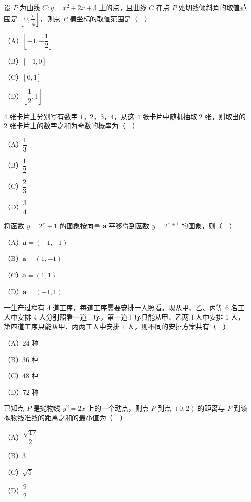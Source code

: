 \begin{question}
设 $P$ 为曲线 $C:y=x^2+2x+3$ 上的点，且曲线 $C$ 在点 $P$ 处切线倾斜角的取值范围是 $\left[0,\dfrac{\pi}{4}\right]$，则点 $P$ 横坐标的取值范围是（　）

（A）$\left[-1,-\dfrac12\right]$

（B）$[-1,0]$

（C）$[0,1]$

（D）$\left[\dfrac12,1\right]$

\end{question}
\begin{question}
$4$ 张卡片上分别写有数字 $1$，$2$，$3$，$4$，从这 $4$ 张卡片中随机抽取 $2$ 张，则取出的 $2$ 张卡片上的数字之和为奇数的概率为（　）

（A）$\dfrac13$

（B）$\dfrac12$

（C）$\dfrac23$

（D）$\dfrac34$

\end{question}
\begin{question}
将函数 $y=2^x+1$ 的图象按向量 $\boldsymbol a$ 平移得到函数 $y=2^{x+1}$ 的图象，则（　）

（A）$\boldsymbol a=(-1,-1)$

（B）$\boldsymbol a=(1,-1)$

（C）$\boldsymbol a=(1,1)$

（D）$\boldsymbol a=(-1,1)$

\end{question}
\begin{question}
一生产过程有 $4$ 道工序，每道工序需要安排一人照看。现从甲、乙、丙等 $6$ 名工人中安排 $4$ 人分别照看一道工序，第一道工序只能从甲、乙两工人中安排 $1$ 人，第四道工序只能从甲、丙两工人中安排 $1$ 人，则不同的安排方案共有（　）

（A）$24$ 种

（B）$36$ 种

（C）$48$ 种

（D）$72$ 种

\end{question}
\begin{question}
已知点 $P$ 是抛物线 $y^2=2x$ 上的一个动点，则点 $P$ 到点 $(0,2)$ 的距离与 $P$ 到该抛物线准线的距离之和的最小值为（　）

（A）$\dfrac{\sqrt{17}}{2}$

（B）$3$

（C）$\sqrt5$

（D）$\dfrac92$

\end{question}
